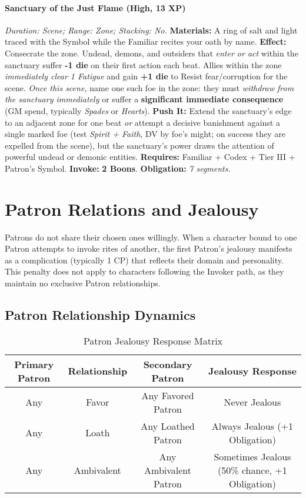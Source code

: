 \documentclass[12pt,twoside]{book}
\begin{document}
\paragraph{Sanctuary of the Just Flame (High, 13 XP)} \emph{Duration: Scene; Range: Zone; Stacking: No.}  
\textbf{Materials:} A ring of salt and light traced with the Symbol while the Familiar recites your oath by name.  
\textbf{Effect:} Consecrate the zone. Undead, demons, and outsiders that \emph{enter or act} within the sanctuary suffer \textbf{-1 die} on their first action each beat. Allies within the zone \emph{immediately clear 1 Fatigue} and gain \textbf{+1 die} to Resist fear/corruption for the scene. \emph{Once this scene,} name one such foe in the zone: they must \emph{withdraw from the sanctuary immediately} or suffer a \textbf{significant immediate consequence} (GM spend, typically \emph{Spades} or \emph{Hearts}).  
\textbf{Push It:} Extend the sanctuary's edge to an adjacent zone for one beat \emph{or} attempt a decisive banishment against a single marked foe (test \emph{Spirit + Faith}, DV by foe's might; on success they are expelled from the scene), but the sanctuary's power draws the attention of powerful undead or demonic entities.
\textbf{Requires:} Familiar + Codex + Tier III + Patron's Symbol. \;\; \textbf{Invoke:} \textbf{2 Boons}. \;\; \textbf{Obligation:} \emph{7 segments.}

\section{Patron Relations and Jealousy}

Patrons do not share their chosen ones willingly. When a character bound to one Patron attempts to invoke rites of another, the first Patron's jealousy manifests as a complication (typically 1 CP) that reflects their domain and personality. This penalty does not apply to characters following the Invoker path, as they maintain no exclusive Patron relationships.

\subsection{Patron Relationship Dynamics}

\begin{table}[htbp]
\centering
\begin{tabular}{|c|c|c|c|}
\hline
\textbf{Primary Patron} & \textbf{Relationship} & \textbf{Secondary Patron} & \textbf{Jealousy Response} \\
\hline
Any & Favor & Any Favored Patron & Never Jealous \\
\hline
Any & Loath & Any Loathed Patron & Always Jealous (+1 Obligation) \\
\hline
Any & Ambivalent & Any Ambivalent Patron & Sometimes Jealous (50\% chance, +1 Obligation) \\
\hline
\end{tabular}
\caption{Patron Jealousy Response Matrix}
\end{table}
\end{document}
